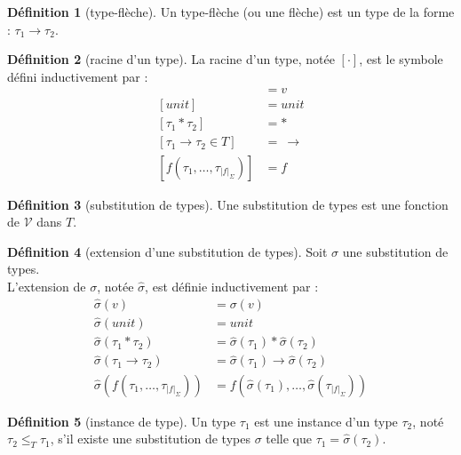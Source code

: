\documentclass [a4paper] {report}
\theoremstyle {definition}
\newtheorem {definition} {Définition} [section]
\newcommand {\V} {\mathscr V}
\begin{document}
\begin {definition} [type-flèche]
	Un type-flèche (ou une flèche) est un type de la forme : $\tau_1 \rightarrow \tau_2$.
\end {definition}

\begin {definition} [racine d'un type]
	La racine d'un type, notée $[ \cdot ]$, est le symbole défini inductivement par :
	\begin {align*}
		[ v ] &= v \\
		[ unit ] &= unit \\
		[ \tau_1 * \tau_2 ] &= * \\
		[ \tau_1 \rightarrow \tau_2 \in T ] &=\ \rightarrow \\
		[ f (\tau_1, \dots, \tau_{|f|_\Sigma}) ] &= f
	\end {align*}
\end {definition}

\begin {definition} [substitution de types]
	Une substitution de types est une fonction de $\V$ dans $T$.
\end {definition}

\begin {definition} [extension d'une substitution de types]
	Soit $\sigma$ une substitution de types. \\
	L'extension de $\sigma$, notée $\hat \sigma$, est définie inductivement par :
	\begin {align*}
		\hat \sigma (v) &= \sigma (v) \\
		\hat \sigma (unit) &= unit \\
		\hat \sigma (\tau_1 * \tau_2) &= \hat \sigma (\tau_1) * \hat \sigma (\tau_2) \\
		\hat \sigma (\tau_1 \rightarrow \tau_2) &= \hat \sigma (\tau_1) \rightarrow \hat \sigma (\tau_2) \\
		\hat \sigma (f (\tau_1, \dots, \tau_{|f|_\Sigma})) &= f (\hat \sigma (\tau_1), \dots, \hat \sigma (\tau_{|f|_\Sigma}))
	\end {align*}
\end {definition}

\begin {definition} [instance de type]
	Un type $\tau_1$ est une instance d'un type $\tau_2$, noté $\tau_2 \leqslant_T \tau_1$, s'il existe une substitution de types $\sigma$  telle que $\tau_1 = \hat \sigma (\tau_2)$.
\end {definition}

\end{document}
